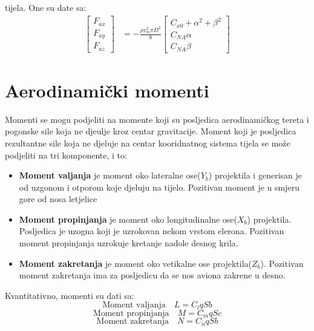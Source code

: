 tijela. One su date sa:
\begin{align}
    \begin{bmatrix}
        F_{ax}\\F_{ay}\\F_{az} 
        \end{bmatrix}
        &= -\frac{\rho v_m^2\pi D^2}{8}\begin{bmatrix}
        C_{x0} + \alpha^2+\beta^2\\C_{NA}\alpha\\C_{NA}\beta
        \end{bmatrix}
\end{align}
\section{Aerodinamički momenti}
Momenti se mogu podjeliti na momente koji su posljedica aerodinamičkog tereta i 
pogonske sile koja ne djeulje kroz centar gravitacije. Moment koji je posljedica 
rezultantne sile koja ne djeluje na centar kooridnatnog sistema tijela se može 
podjeliti na tri komponente, i to:
\begin{itemize}
    \item \textbf{Moment valjanja} je moment oko lateralne ose($Y_b$) projektila i generisan 
    je od uzgonom i otporom koje djeluju na tijelo. Pozitivan moment je u smjeru gore 
    od nosa letjelice 
    
    \item \textbf{Moment propinjanja} je moment oko longitudinalne ose($X_b$) projektila.
    Posljedica je uzogna koji je uzrokovan nekom vrstom elerona. Pozitivan moment propinjanja uzrokuje kretanje nadole 
    desnog krila.
    
    \item \textbf{Moment zakretanja} je moment oko vetikalne ose projektila($Z_b$). Pozitivan moment zakretanja 
    ima za posljedicu da se nos aviona zakrene u desno. 
\end{itemize}
Kvantitativno, momenti su dati sa:
\begin{equation}
    \text{Moment valjanja} \quad L=C_lqSb
    \label{eq:a1}
 \end{equation}
 \begin{equation}
     \text{Moment propinjanja} \quad M=C_mqSc
     \label{eq:a2}
 \end{equation}
 \begin{equation}
     \text{Moment zakretanja} \quad N=C_nqSb
     \label{eq:a3}
 \end{equation}

